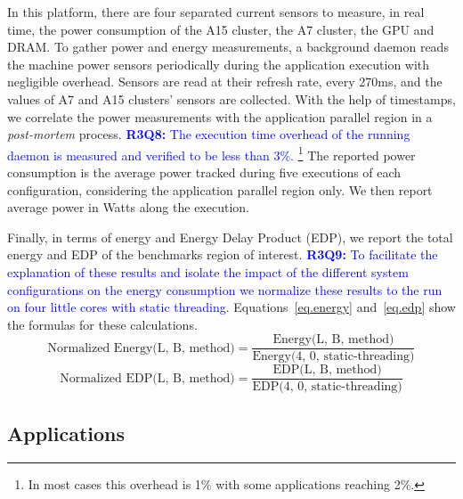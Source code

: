 In this platform, there are four separated current sensors to measure, in real time, the power consumption of the A15 cluster, the A7 cluster, the GPU and DRAM. 
To gather power and energy measurements, a background daemon reads the machine power 
sensors periodically during the application execution with negligible overhead. 
Sensors are read at their refresh rate, every 270ms, and the values of A7 and A15 clusters' sensors are collected.
With the help of timestamps, we correlate the power measurements with the application parallel region in a \emph{post-mortem} process.
\textcolor{blue}{
\textbf{R3Q8:} The execution time overhead of the running daemon is measured and verified to be less than 3\%. \footnote{In most cases this overhead is 1\% with some applications reaching 2\%.}
}
The reported power consumption is the average power tracked during five executions of each configuration, considering the application parallel region only. 
We then report average power in Watts along the execution. 

Finally, in terms of energy and Energy Delay Product (EDP), we report the total energy and EDP of 
the benchmarks region of interest.
\textcolor{blue}{
\textbf{R3Q9:} To facilitate the explanation of these results and isolate the impact of the different system configurations on the energy consumption we normalize these results to the run on four little cores with static threading.
}
Equations~\ref{eq.energy} and~\ref{eq.edp} show the formulas for these calculations.
\begingroup\makeatletter\def\f@size{8}\check@mathfonts
\begin{equation}
  \text{Normalized Energy(L, B, method)} = \frac{\text{Energy(L, B, method)}}{\text{Energy(4, 0, static-threading)}}
  \label{eq.energy}
\end{equation}
\begin{equation}
  \text{Normalized EDP(L, B, method)} = \frac{\text{EDP(L, B, method)}}{\text{EDP(4, 0, static-threading)}}
  \label{eq.edp}
\end{equation}
\endgroup




\subsection{Applications}
\label{sec:parsec}

